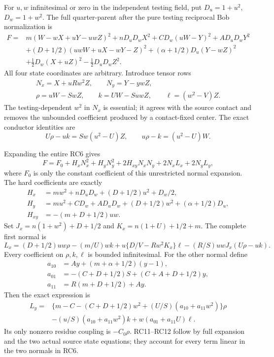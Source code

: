 For $u,w$ infinitesimal or zero in the independent testing field,
put $D_u=1+u^2$, $D_w=1+w^2$. The full quarter-parent after
the pure testing reciprocal Bob normalization is
\[
\begin{split}
 F={}&m(W-wX+uY-uwZ)^2+nD_uD_wX^2
       +CD_w(uW-Y)^2+AD_uD_wY^2\\
 &+(D+1/2)(uwW+uX-wY-Z)^2
       +(\alpha+1/2)D_u(Y-wZ)^2\\
 &+\tfrac12D_w(X+uZ)^2-\tfrac12D_uD_wZ^2.
\end{split}\tag{RC6}
\]
All four state coordinates are arbitrary. Introduce tensor rows
\[
 \begin{gathered}
 N_x=X+uRw^2Z,\qquad N_y=Y-ywZ,\\
 \rho=uW-SwZ,\qquad k=UW-SuwZ,\qquad \ell=(w^2-V)Z.
 \end{gathered}
 \tag{RC7}
\]
The testing-dependent $w^2$ in $N_x$ is essential; it agrees with
the source contact and removes the unbounded coefficient produced
by a contact-fixed center. The exact conductor identities are
\[
 U\rho-uk=Sw(u^2-U)Z,\qquad
 u\rho-k=(u^2-U)W.
 \tag{RC8}
\]

Expanding the entire RC6 gives
\[
 F=F_0+H_xN_x^2+H_yN_y^2+2H_{xy}N_xN_y
                         +2N_xL_x+2N_yL_y,
 \tag{RC9}
\]
where $F_0$ is only the constant coefficient of this unrestricted
normal expansion. The hard coefficients are exactly
\[
\begin{split}
 H_x&=mw^2+nD_uD_w+(D+1/2)u^2+D_w/2,\\
 H_y&=mu^2+CD_w+AD_uD_w+(D+1/2)w^2+(\alpha+1/2)D_u,\\
 H_{xy}&=-(m+D+1/2)uw.
\end{split}\tag{RC10}
\]
Set $J_x=n(1+w^2)+D+1/2$ and $K_x=n(1+U)+1/2+m$.
The complete first normal is
\[
 L_x=(D+1/2)uw\rho-(m/U)wk
 +u\{D/V-Rw^2K_x\}\ell
 -(R/S)uwJ_x(U\rho-uk).
 \tag{RC11}
\]
Every coefficient on $\rho,k,\ell$ is bounded infinitesimal.
For the other normal define
\[
 \begin{aligned}
 a_{10}&=Ay+(m+\alpha+1/2)(y-1),\\
 a_{01}&=-(C+D+1/2)S+(C+A+D+1/2)y,\\
 a_{11}&=R(m+D+1/2)+Ay.
 \end{aligned}
\]
Then the exact expression is
\[
\begin{split}
 L_y={}&\{m-C-(C+D+1/2)w^2+(U/S)(a_{10}+a_{11}w^2)\}\rho\\
 &-(u/S)(a_{10}+a_{11}w^2)k+w(a_{01}+a_{11}U)\ell.
\end{split}\tag{RC12}
\]
Its only nonzero residue coupling is $-C_0\rho$. RC11--RC12
follow by full expansion and the two actual source state equations;
they account for every term linear in the two normals in RC6.

